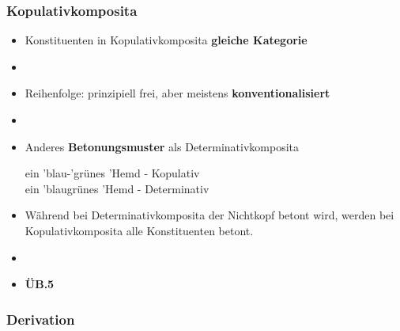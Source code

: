 \begin{frame}
\frametitle{Kopulativkomposita}

\begin{itemize}
	\item Konstituenten in Kopulativkomposita \ras \textbf{gleiche Kategorie}
	\item[]
	\item Reihenfolge: prinzipiell frei, aber meistens \textbf{konventionalisiert}
	\item[]
	\item Anderes \textbf{Betonungsmuster} als Determinativkomposita
	
	\ea ein 'blau-'grünes 'Hemd - Kopulativ \\
		 ein 'blaugrünes 'Hemd - Determinativ
	\z
		 
	\item Während bei Determinativkomposita der Nichtkopf betont wird, werden bei Kopulativkomposita alle Konstituenten betont.
	\item[]
	\item[] \textbf{ÜB.5}
\end{itemize}


\end{frame}










\subsubsection{Derivation}





